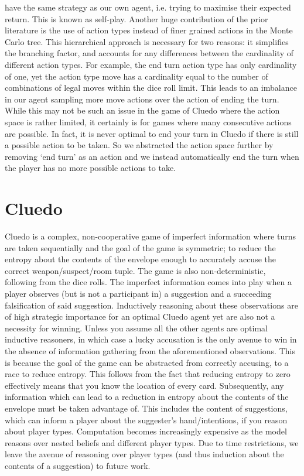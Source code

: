 \documentclass[a4paper,12pt]{proposal}
\begin{document}
have the same strategy as our own agent, i.e. trying to maximise their expected return. This is known as self-play.
Another huge contribution of the prior literature is the use of action types instead of finer grained actions in the Monte Carlo tree. This hierarchical approach is necessary for two reasons: it simplifies the branching factor, and accounts for any differences between the cardinality of different action types. For example, the end turn action type has only cardinality of one, yet the action type move has a cardinality equal to the number of combinations of legal moves within the dice roll limit. This leads to an imbalance in our agent sampling more move actions over the action of ending the turn. While this may not be such an issue in the game of Cluedo where the action space is rather limited, it certainly is for games where many consecutive actions are possible. In fact, it is never optimal to end your turn in Cluedo if there is still a possible action to be taken. So we abstracted the action space further by removing ‘end turn’ as an action and we instead automatically end the turn when the player has no more possible actions to take.

\section{Cluedo}
Cluedo is a complex, non-cooperative game of imperfect information where turns are taken sequentially and the goal of the game is symmetric; to reduce the entropy about the contents of the envelope enough to accurately accuse the correct weapon/suspect/room tuple. The game is also non-deterministic, following from the dice rolls. The imperfect information comes into play when a player observes (but is not a participant in) a suggestion and a succeeding falsification of said suggestion. Inductively reasoning about these observations are of high strategic importance for an optimal Cluedo agent yet are also not a necessity for winning. Unless you assume all the other agents are optimal inductive reasoners, in which case a lucky accusation is the only avenue to win in the absence of information gathering from the aforementioned observations. This is because the goal of the game can be abstracted from correctly accusing, to a race to reduce entropy. This follows from the fact that reducing entropy to zero effectively means that you know the location of every card. Subsequently, any information which can lead to a reduction in entropy about the contents of the envelope must be taken advantage of. This includes the content of suggestions, which can inform a player about the suggester’s hand/intentions, if you reason about player types. Computation becomes increasingly expensive as the model reasons over nested beliefs and different player types. Due to time restrictions, we leave the avenue of reasoning over player types (and thus induction about the contents of a suggestion) to future work. 
\end{document}
